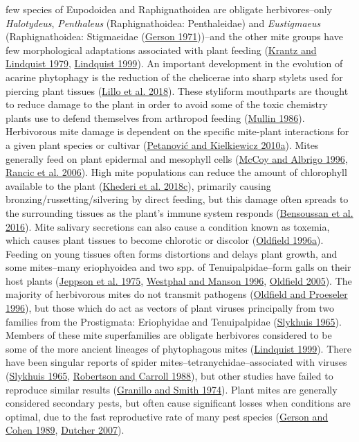 \documentclass{ufdissertation}[overrideChapters] %
\begin{document}
{few species of Eupodoidea and Raphignathoidea are obligate herbivores--only \emph{Halotydeus}, \emph{Penthaleus} (Raphignathoidea: Penthaleidae) and \emph{Eustigmaeus} (Raphignathoidea: Stigmaeidae (\protect\hyperlink{ref-Gerson1971}{Gerson 1971}))--and the other mite groups have few morphological adaptations associated with plant feeding (\protect\hyperlink{ref-Krantz1979}{Krantz and Lindquist 1979}, \protect\hyperlink{ref-Lindquist1999}{Lindquist 1999}). An important development in the evolution of acarine phytophagy is the reduction of the chelicerae into sharp stylets used for piercing plant tissues (\protect\hyperlink{ref-Lillo2018}{Lillo et al. 2018}). These styliform mouthparts are thought to reduce damage to the plant in order to avoid some of the toxic chemistry plants use to defend themselves from arthropod feeding (\protect\hyperlink{ref-Brattsten1986}{Mullin 1986}). Herbivorous mite damage is dependent on the specific mite-plant interactions for a given plant species or cultivar (\protect\hyperlink{ref-Petanovic2010}{Petanović and Kielkiewicz 2010a}). Mites generally feed on plant epidermal and mesophyll cells (\protect\hyperlink{ref-McCoy1996}{McCoy and Albrigo 1996}, \protect\hyperlink{ref-Rancic2006}{Rancic et al. 2006}). High mite populations can reduce the amount of chlorophyll available to the plant (\protect\hyperlink{ref-Khederi2018a}{Khederi et al. 2018c}), primarily causing bronzing/russetting/silvering by direct feeding, but this damage often spreads to the surrounding tissues as the plant's immune system responds (\protect\hyperlink{ref-Bensoussan2016}{Bensoussan et al. 2016}). Mite salivary secretions can also cause a condition known as toxemia, which causes plant tissues to become chlorotic or discolor (\protect\hyperlink{ref-Oldfield1996}{Oldfield 1996a}). Feeding on young tissues often forms distortions and delays plant growth, and some mites--many eriophyoidea and two spp. of Tenuipalpidae--form galls on their host plants (\protect\hyperlink{ref-Jeppson1975}{Jeppson et al. 1975}, \protect\hyperlink{ref-Westphal1996}{Westphal and Manson 1996}, \protect\hyperlink{ref-Oldfield2005}{Oldfield 2005}). The majority of herbivorous mites do not transmit pathogens (\protect\hyperlink{ref-Oldfield1996a}{Oldfield and Proeseler 1996}), but those which do act as vectors of plant viruses principally from two families from the Prostigmata: Eriophyidae and Tenuipalpidae (\protect\hyperlink{ref-Slykhuis1965}{Slykhuis 1965}). Members of these mite superfamilies are obligate herbivores considered to be some of the more ancient lineages of phytophagous mites (\protect\hyperlink{ref-Lindquist1999}{Lindquist 1999}). There have been singular reports of spider mites--tetranychidae--associated with viruses (\protect\hyperlink{ref-Slykhuis1965}{Slykhuis 1965}, \protect\hyperlink{ref-Robertson1988}{Robertson and Carroll 1988}), but other studies have failed to reproduce similar results (\protect\hyperlink{ref-Granillo1974}{Granillo and Smith 1974}). Plant mites are generally considered secondary pests, but often cause significant losses when conditions are optimal, due to the fast reproductive rate of many pest species (\protect\hyperlink{ref-Gerson1989}{Gerson and Cohen 1989}, \protect\hyperlink{ref-Dutcher2007}{Dutcher 2007}).

}
\end{document}
